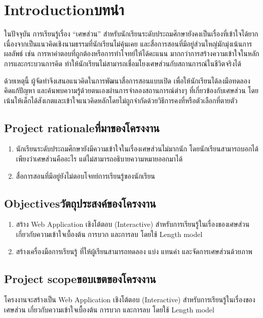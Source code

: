 \chapter{\ifenglish Introduction\else บทนำ\fi}
ในปัจจุบัน การเรียนรู้เรื่อง “เศษส่วน” สำหรับนักเรียนระดับประถมศึกษายังคงเป็นเรื่องที่เข้าใจได้ยาก เนื่องจากเป็นแนวคิดเชิงนามธรรมที่นักเรียนไม่คุ้นเคย และสื่อการสอนที่มีอยู่ส่วนใหญ่มักมุ่งเน้นการผลลัพธ์ เช่น การหาคำตอบที่ถูกต้องหรือการทำโจทย์ให้ได้คะแนน มากกว่าการสร้างความเข้าใจในหลักการและกระบวนการคิด ทำให้นักเรียนไม่สามารถเชื่อมโยงเศษส่วนกับสถานการณ์ในชีวิตจริงได้

ด้วยเหตุนี้ ผู้จัดทำจึงเสนอแนวคิดในการพัฒนาสื่อการสอนแบบเปิด เพื่อให้นักเรียนได้ลงมือทดลอง คิดแก้ปัญหา และค้นพบความรู้ด้วยตนเองผ่านการจำลองสถานการณ์ต่างๆ ที่เกี่ยวข้องกับเศษส่วน โดยเน้นให้เด็กได้สังเกตและเข้าใจแนวคิดหลักโดยไม่ถูกจำกัดด้วยวิธีการคงที่หรือตัวเลือกที่ตายตัว

\section{\ifenglish Project rationale\else ที่มาของโครงงาน\fi}
\begin{enumerate}
    \item นักเรียนระดับประถมศึกษายังมีความเข้าใจในเรื่องเศษส่วนไม่มากนัก โดยนักเรียนสามารถบอกได้เพียงว่าเศษส่วนคืออะไร แต่ไม่สามารถอธิบายความหมายออกมาได้
    \item สื่อการสอนที่มีอยู่ยังไม่ตอบโจทย์การเรียนรู้ของนักเรียน
\end{enumerate}

\section{\ifenglish Objectives\else วัตถุประสงค์ของโครงงาน\fi}
\begin{enumerate}
    \item สร้าง Web Application เชิงโต้ตอบ (Interactive) สำหรับการเรียนรู้ในเรื่องของเศษส่วน เกี่ยวกับความเข้าใจเบื้องต้น การบวก และการลบ โดยใช้ Length model
    \item สร้างเครื่องมือการเรียนรู้ ที่ให้ผู้เรียนสามารถทดลอง แบ่ง แทนค่า และจัดการเศษส่วนด้วยภาพ
\end{enumerate}

\section{\ifenglish Project scope\else ขอบเขตของโครงงาน\fi}
โครงงานจะสร้างเป็น Web Application เชิงโต้ตอบ (Interactive) สำหรับการเรียนรู้ในเรื่องของเศษส่วน เกี่ยวกับความเข้าใจเบื้องต้น การบวก และการลบ โดยใช้ Length model

